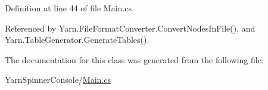 Definition at line 44 of file Main.\-cs.



Referenced by Yarn.\-File\-Format\-Converter.\-Convert\-Nodes\-In\-File(), and Yarn.\-Table\-Generator.\-Generate\-Tables().



The documentation for this class was generated from the following file\-:\begin{DoxyCompactItemize}
\item 
Yarn\-Spinner\-Console/\hyperlink{a00313}{Main.\-cs}\end{DoxyCompactItemize}
